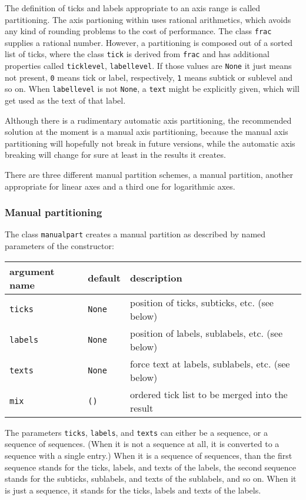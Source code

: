 The definition of ticks and labels appropriate to an axis range is
called partitioning. The axis partioning within \PyX{} uses rational
arithmetics, which avoids any kind of rounding problems to the cost of
performance. The class \verb|frac| supplies a rational number.
However, a partitioning is composed out of a sorted list of ticks,
where the class \verb|tick| is derived from \verb|frac| and has
additional properties called \verb|ticklevel|, \verb|labellevel|. If
those values are \verb|None| it just means not present, \verb|0| means
tick or label, respectively, \verb|1| means subtick or sublevel and so
on. When \verb|labellevel| is not \verb|None|, a \verb|text| might be
explicitly given, which will get used as the text of that label.

Although there is a rudimentary automatic axis partitioning, the
recommended solution at the moment is a manual axis partitioning,
because the manual axis partitioning will hopefully not break in
future versions, while the automatic axis breaking will change for
sure at least in the results it creates.

There are three different manual partition schemes, a manual
partition, another appropriate for linear axes and a third one for
logarithmic axes.

\subsubsection{Manual partitioning}

The class \verb|manualpart| creates a manual partition as described by
named parameters of the constructor:

\medskip
\begin{tabularx}{\linewidth}{ll>{\raggedright\arraybackslash}X}
argument name&default&description\\
\hline
\texttt{ticks}&\texttt{None}&position of ticks, subticks, etc. (see below)\\
\texttt{labels}&\texttt{None}&position of labels, sublabels, etc. (see below)\\
\texttt{texts}&\texttt{None}&force text at labels, sublabels, etc. (see below)\\
\texttt{mix}&\texttt{()}&ordered tick list to be merged into the result\\
\end{tabularx}
\medskip

The parameters \verb|ticks|, \verb|labels|, and \verb|texts| can
either be a sequence, or a sequence of sequences. (When it is not a
sequence at all, it is converted to a sequence with a single entry.)
When it is a sequence of sequences, than the first sequence stands for
the ticks, labels, and texts of the labels, the second sequence stands
for the subticks, sublabels, and texts of the sublabels, and so on.
When it is just a sequence, it stands for the ticks, labels and texts
of the labels.

